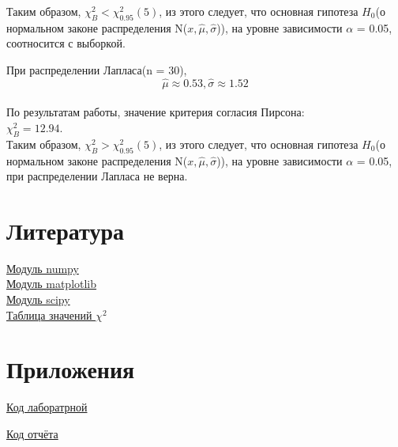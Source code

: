 \documentclass[a4]{article}
\begin{document}
		Таким образом, $\chi^2_B < \chi^2_{0.95}(5)$, из этого следует, что основная гипотеза $H_0$(о нормальном законе распределения N($x, \hat{\mu}, \hat{\sigma}$)), на уровне зависимости $\alpha$ = 0.05, соотносится с выборкой.
		
		При распределении Лапласа(n = 30), $$\hat{\mu} \approx 0.53, \hat{\sigma} \approx 1.52$$\\
		По результатам работы, значение критерия согласия Пирсона:\\
		$\chi^2_B = 12.94$.\\
		Таким образом, $\chi^2_B > \chi^2_{0.95}(5)$, из этого следует, что основная гипотеза $H_0$(о нормальном законе распределения N($x, \hat{\mu}, \hat{\sigma}$)), на уровне зависимости $\alpha$ = 0.05, при распределении Лапласа не верна.
	\section{Литература}
	
	\href{https://physics.susu.ru/vorontsov/language/numpy.html}{Модуль numpy}\\
	
	\href{https://matplotlib.org/}{Модуль matplotlib}\\
	
	\href{https://www.scipy.org/}{Модуль scipy}\\
	
	\href{https://ru.wikipedia.org/wiki/%D0%9A%D0%B2%D0%B0%D0%BD%D1%82%D0%B8%D0%BB%D0%B8_%D1%80%D0%B0%D1%81%D0%BF%D1%80%D0%B5%D0%B4%D0%B5%D0%BB%D0%B5%D0%BD%D0%B8%D1%8F_%D1%85%D0%B8-%D0%BA%D0%B2%D0%B0%D0%B4%D1%80%D0%B0%D1%82}{Таблица значений $\chi^2$}\\
	
	\section{Приложения}
	
	\href{https://github.com/LuciusGen/Matstat/blob/master/Lab6/Lab7.py}{Код лаборатрной}
	
	\href{https://github.com/LuciusGen/Matstat/blob/master/Lab6/lab7.tex}{Код отчёта}
	
\end{document}
